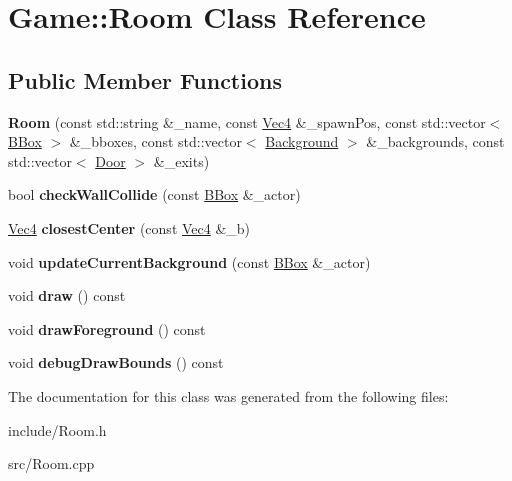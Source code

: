 \hypertarget{classGame_1_1Room}{\section{Game\-:\-:Room Class Reference}
\label{classGame_1_1Room}
}
\subsection*{Public Member Functions}
\begin{DoxyCompactItemize}
\item 
\hypertarget{classGame_1_1Room_a98ff07a9f284a58c1b3b62af924991cb}{{\bfseries Room} (const std\-::string \&\-\_\-name, const \hyperlink{classVec4}{Vec4} \&\-\_\-spawn\-Pos, const std\-::vector$<$ \hyperlink{classGame_1_1BBox}{B\-Box} $>$ \&\-\_\-bboxes, const std\-::vector$<$ \hyperlink{classGame_1_1Background}{Background} $>$ \&\-\_\-backgrounds, const std\-::vector$<$ \hyperlink{classGame_1_1Door}{Door} $>$ \&\-\_\-exits)}\label{classGame_1_1Room_a98ff07a9f284a58c1b3b62af924991cb}

\item 
\hypertarget{classGame_1_1Room_a44a5427e27772dd9951f8ccffaed67c4}{bool {\bfseries check\-Wall\-Collide} (const \hyperlink{classGame_1_1BBox}{B\-Box} \&\-\_\-actor)}\label{classGame_1_1Room_a44a5427e27772dd9951f8ccffaed67c4}

\item 
\hypertarget{classGame_1_1Room_ac191bb9864dea92fda050cd43a8e036a}{\hyperlink{classVec4}{Vec4} {\bfseries closest\-Center} (const \hyperlink{classVec4}{Vec4} \&\-\_\-b)}\label{classGame_1_1Room_ac191bb9864dea92fda050cd43a8e036a}

\item 
\hypertarget{classGame_1_1Room_ad2436d86e5967aebce927a7c3180c2a9}{void {\bfseries update\-Current\-Background} (const \hyperlink{classGame_1_1BBox}{B\-Box} \&\-\_\-actor)}\label{classGame_1_1Room_ad2436d86e5967aebce927a7c3180c2a9}

\item 
\hypertarget{classGame_1_1Room_a99b9b594ca32e59896143ae16d330fe9}{void {\bfseries draw} () const }\label{classGame_1_1Room_a99b9b594ca32e59896143ae16d330fe9}

\item 
\hypertarget{classGame_1_1Room_a9f385c3c9d9f9913e97f1301fd19d1c1}{void {\bfseries draw\-Foreground} () const }\label{classGame_1_1Room_a9f385c3c9d9f9913e97f1301fd19d1c1}

\item 
\hypertarget{classGame_1_1Room_a59bf840b046467519e94e0b6e305c7fe}{void {\bfseries debug\-Draw\-Bounds} () const }\label{classGame_1_1Room_a59bf840b046467519e94e0b6e305c7fe}

\end{DoxyCompactItemize}


The documentation for this class was generated from the following files\-:\begin{DoxyCompactItemize}
\item 
include/Room.\-h\item 
src/Room.\-cpp\end{DoxyCompactItemize}
